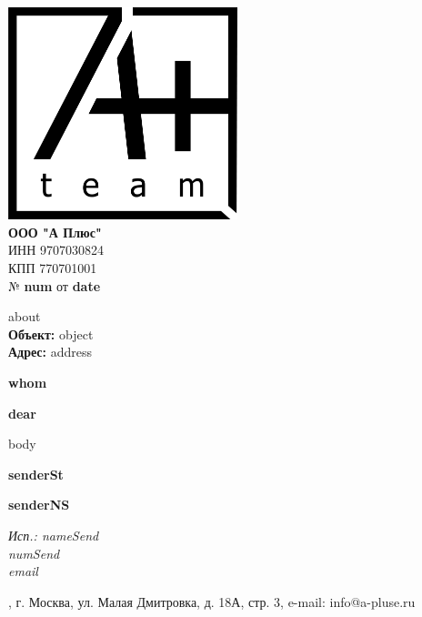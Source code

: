 \documentclass[a4paper,12pt]{letter}
\begin{document}
\noindent
\begin{minipage}[t]{0.5\textwidth}
    \vspace{0pt} %
    \includegraphics[width=0.5\textwidth]{A.png} \\ %
    \textbf{ООО "А Плюс"} \\
    ИНН 9707030824 \\
    КПП 770701001 \\
    № \textbf{ {{num}} } от \textbf{ {{date}} } \\
\end{minipage}%

\begin{minipage}[t]{0.5\textwidth} 
    {{about}} \\
    \textbf{Объект:} {{object}} \\
    \textbf{Адрес:} {{address}}
\end{minipage}%
\begin{minipage}[t]{0.5\textwidth}
    \raggedleft
    \bfseries
    {{whom}}
\end{minipage}

\vspace{1cm}

\begin{center}
    \textbf{ {{dear}} }
\end{center}


\vspace{0.5cm}

\begin{minipage}[t]{\textwidth}
    \raggedright
    {{body}} 
\end{minipage}

\vspace{1cm}


\begin{minipage}[t]{0.4\textwidth}
    \textbf{ {{senderSt}} }
\end{minipage}%
\begin{minipage}[t]{0.2\textwidth}
    \centering
    \underline{\hspace{5cm}}
\end{minipage}%
\begin{minipage}[t]{0.4\textwidth}
    \raggedleft
    \textbf{ {{senderNS}} }
\end{minipage}


\vfill

\noindent
\itshape
Исп.: {{nameSend}} \\
{{numSend}} \\
{{email}}

\noindent\makebox[\linewidth]{\rule{1\paperwidth}{0.4pt}}
\noindent
\centering
\fontsize{9}{10}, г. Москва, ул. Малая Дмитровка, д. 18А, стр. 3, e-mail: info@a-pluse.ru
\end{document}
